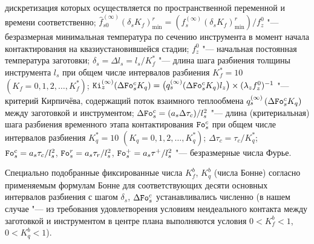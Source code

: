 дискретизация которых осуществляется по пространственной
переменной и времени соответственно; 
$\hat {f}_{s0}^{(\infty )} (\delta _s K_f )_{\min }^r =(f_s^{(\infty )} (\delta _s K_f )_{\min }^r )/ f_z^0$ "--- безразмерная минимальная температура по сечению инструмента в момент начала контактирования
на квазиустановившейся стадии; $f_z^0 $ "--- начальная постоянная
температура заготовки; $\delta _s =\Delta l_s =l_s / K_f^\ast$
"--- длина шага разбиения толщины инструмента $l_s $ при общем
числе интервалов разбиения $K_f^\ast =10$ $( K_f =0, 1, 2, \ldots, K_f^\ast)$; 
${\tt Ki}_z^{(\infty )} ( \Delta {\tt Fo}_s^c K_q )=\bigl(q_s^{(\infty )} ( \Delta {\tt Fo}_s^c K_q )l_z \bigr) \times (\lambda _z f_z^0 )^{-1}$ "--- критерий Кирпичёва,
содержащий поток взаимного теплообмена $q_s^{(\infty )} \left(
\Delta {\tt Fo}_s^c K_q \right)$ между заготовкой и инструментом;
$\Delta {\tt Fo}_s^c = (a_s \Delta \tau _c )/ l_s^2$ "--- длина (критериальная) шага разбиения временного этапа
контактирования ${\tt Fo}_s^c$ при общем числе интервалов разбиения $K_q^\ast =10$ $( K_q =0, 1, 2, \ldots, K_q^\ast )$; $\Delta \tau _c =\tau _c/K_q^\ast $; ${\tt Fo}_s^c =a_s \tau _c / l_s^2$, ${\tt Fo}_s^r =a_s \tau _r / l_s^2 $, ${\tt Fo}_s^+ = a_s \tau ^+ / l_s^2 $ "--- безразмерные числа Фурье.

Специально подобранные фиксированные числа $K_f^b$, $K_q^b $
(числа Бонне) согласно применяемым формулам Бонне
\cite{stulin:bib10} для соответствующих десяти основных интервалов
разбиения с шагом $\delta _s$, $\Delta {\tt Fo}_s^c $ устанавливались
численно (в нашем случае "--- из требования удовлетворения
условиям неидеального контакта между заготовкой и инструментом в
центре плана выполняются условия $0<K_f^b <1$, $0 < K_q^b < 1$).

